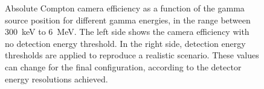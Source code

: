 \begin{figure} [!hbtp]	
\centering
\caption{Absolute Compton camera efficiency as a function of the gamma source position for different gamma energies, in the range between 300~keV to 6~MeV. The left side shows the camera efficiency with no detection energy threshold. In the right side, detection energy thresholds are applied to reproduce a realistic scenario. These values can change for the final configuration, according to the detector energy resolutions achieved.}
\label{fig::efficiency_study}
\end{figure}

